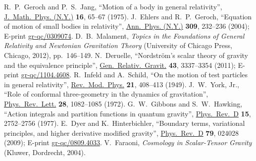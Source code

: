 \documentclass[a4paper,showkeys,aps,prd,reprint,nofootinbib,showpacs,twocolumn]{revtex4-1}
\theoremstyle{plain}
\begin{document}
{\begin{thebibliography}{99}
  R.~P.~Geroch and P.~S.~Jang,
  ``Motion of a body in general relativity'', 
 \href{http://scitation.aip.org/content/aip/journal/jmp/16/1/10.1063/1.522416}{J.~Math.~Phys. (N.Y.)} {\bf 16}, 65--67 (1975).
  J.~Ehlers and R.~P.~Geroch,
  ``Equation of motion of small bodies in relativity'', 
  \href{http://www.sciencedirect.com/science/article/pii/S0003491603002252}{Ann.~Phys. (N.Y.)} {\bf 309}, 232--236 (2004); 
  E-print \href{http://arxiv.org/abs/gr-qc/0309074}{gr-qc/0309074}.
  D.~B.~Malament, 
  {\em Topics in the Foundations of General Relativity and Newtonian Gravitation Theory\/} 
  (University of Chicago Press, Chicago, 2012), pp.~146--149.
  N.~Deruelle,
  ``Nordstr{\"o}m's scalar theory of gravity and the equivalence principle'', 
  \href{http://link.springer.com/article/10.1007%
  2Fs10714-011-1247-x}{Gen.~Relativ.~Gravit.} {\bf 43}, 3337--3354 (2011);   
  E-print \href{http://arxiv.org/abs/1104.4608}{gr-qc/1104.4608}.
R.~Infeld and A.~Schild, 
``On the motion of test particles in general relativity'',
\href{http://rmp.aps.org/abstract/RMP/v21/i3/p408_1}{Rev.\ Mod.\ Phys.} {\bf 21}, 408--413 (1949).
  J.~W.~York, Jr.,
  ``Role of conformal three-geometry in the dynamics of gravitation'', 
  \href{http://prl.aps.org/abstract/PRL/v28/i16/p1082_1}{Phys.\ Rev.\ Lett.} {\bf 28}, 1082--1085 (1972).
  G.~W.~Gibbons and S.~W.~Hawking,
  ``Action integrals and partition functions in quantum gravity'', 
  \href{http://prd.aps.org/abstract/PRD/v15/i10/p2752_1}{Phys.\ Rev.\ D} {\bf 15}, 2752--2756 (1977).
  E.~Dyer and K.~Hinterbichler,
  ``Boundary terms, variational principles, and higher derivative modified gravity'', 
  \href{http://prd.aps.org/abstract/PRD/v79/i2/e024028}{Phys.\ Rev.\ D} {\bf 79}, 024028 (2009);
  E-print \href{http://arxiv.org/abs/arXiv:0809.4033}{gr-qc/0809.4033}.
  V.~Faraoni,
  {\em Cosmology in Scalar-Tensor Gravity\/}  
  (Kluwer, Dordrecht, 2004).

\end{thebibliography}}
\end{document}
